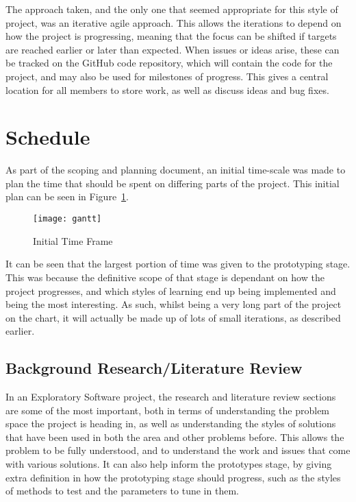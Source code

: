 The approach taken, and the only one that seemed appropriate for this style of
project, was an iterative agile approach. This allows the iterations to depend
on how the project is progressing, meaning that the focus can be shifted if targets
are reached earlier or later than expected.
When issues or ideas arise, these can be tracked on the GitHub code repository,
which will contain the code for the project, and may also be used for milestones
of progress. This gives a central location for all members to store work, as well
as discuss ideas and bug fixes.

\section{Schedule}

As part of the scoping and planning document, an initial time-scale was made
to plan the time that should be spent on differing parts of the project.
This initial plan can be seen in Figure~\ref{fig:gantt}.

\begin{figure}[h!]
    \centering
    \texttt{[image: gantt]}
    \caption{Initial Time Frame}%
    \label{fig:gantt}
\end{figure}

It can be seen that the largest portion of time was given to the prototyping
stage. This was because the definitive scope of that stage is dependant on how
the project progresses, and which styles of learning end up being implemented and
being the most interesting. As such, whilst being a very long part of the project
on the chart, it will actually be made up of lots of small iterations, as described
earlier.

\subsection{Background Research/Literature Review}

In an Exploratory Software project, the research and literature review sections
are some of the most important, both in terms of understanding the problem
space the project is heading in, as well as understanding the styles of
solutions that have been used in both the area and other problems before.
This allows the problem to be fully understood, and to understand the work
and issues that come with various solutions. It can also help inform
the prototypes stage, by giving extra definition in how the prototyping stage
should progress, such as the styles of methods to test and the parameters to tune
in them.

